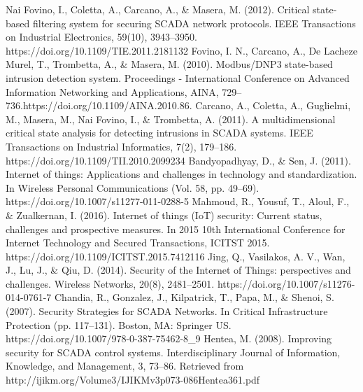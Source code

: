 \documentclass[letterpaper, 10 pt, conference]{ieeeconf}  %
\begin{document}













\begin{thebibliography}{99}
 Nai Fovino, I., Coletta, A., Carcano, A., \& Masera, M. (2012). Critical state-based filtering system for securing SCADA network protocols. IEEE Transactions on Industrial Electronics, 59(10), 3943–3950. https://doi.org/10.1109/TIE.2011.2181132
 Fovino, I. N., Carcano, A., De Lacheze Murel, T., Trombetta, A., \& Masera, M. (2010). Modbus/DNP3 state-based intrusion detection system. Proceedings - International Conference on Advanced Information Networking and Applications, AINA, 729–736.https://doi.org/10.1109/AINA.2010.86.
 Carcano, A., Coletta, A., Guglielmi, M., Masera, M., Nai Fovino, I., \& Trombetta, A. (2011). A multidimensional critical state analysis for detecting intrusions in SCADA systems. IEEE Transactions on Industrial Informatics, 7(2), 179–186. https://doi.org/10.1109/TII.2010.2099234
 Bandyopadhyay, D., \& Sen, J. (2011). Internet of things: Applications and challenges in technology and standardization. In Wireless Personal Communications (Vol. 58, pp. 49–69). https://doi.org/10.1007/s11277-011-0288-5
 Mahmoud, R., Yousuf, T., Aloul, F., \& Zualkernan, I. (2016). Internet of things (IoT) security: Current status, challenges and prospective measures. In 2015 10th International Conference for Internet Technology and Secured Transactions, ICITST 2015. https://doi.org/10.1109/ICITST.2015.7412116
Jing, Q., Vasilakos, A. V., Wan, J., Lu, J., \& Qiu, D. (2014). Security of the Internet of Things: perspectives and challenges. Wireless Networks, 20(8), 2481–2501. https://doi.org/10.1007/s11276-014-0761-7
 Chandia, R., Gonzalez, J., Kilpatrick, T., Papa, M., \& Shenoi, S. (2007). Security Strategies for SCADA Networks. In Critical Infrastructure Protection (pp. 117–131). Boston, MA: Springer US. https://doi.org/10.1007/978-0-387-75462-8\_9
 Hentea, M. (2008). Improving security for SCADA control systems. Interdisciplinary Journal of Information, Knowledge, and Management, 3, 73–86. Retrieved from http://ijikm.org/Volume3/IJIKMv3p073-086Hentea361.pdf

\end{thebibliography}
\end{document}
